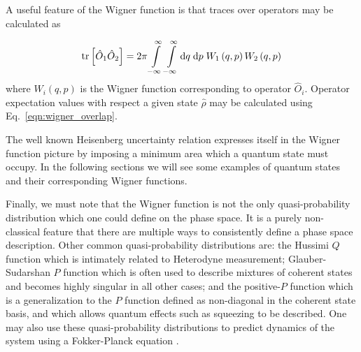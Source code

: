 
\noindent A useful feature of the Wigner function is that traces over operators may be calculated as

\begin{equation}\label{eqn:wigner_overlap}
\tr\left[\hat{O}_1 \hat{O}_2\right] = 2\pi \int\limits_{-\infty}^\infty \int\limits_{-\infty}^{\infty} \mathrm{d}q \; \mathrm{d}p \; W_1\left(q, p\right) W_2\left(q, p\right)
\end{equation}
where $W_i\left(q, p\right)$ is the Wigner function corresponding to operator $\hat{O}_i$. Operator expectation values with respect a given state $\hat{\rho}$ may be calculated using Eq.~\ref{eqn:wigner_overlap}. 

The well known Heisenberg uncertainty relation expresses itself in the Wigner function picture by imposing a minimum area which a quantum state must occupy. In the following sections we will see some examples of quantum states and their corresponding Wigner functions. 



Finally, we must note that the Wigner function is not the only quasi-probability distribution which one could define on the phase space. It is a purely non-classical feature that there are multiple ways to consistently define a phase space description. Other common quasi-probability distributions are: the Hussimi $Q$ function  which is intimately related to Heterodyne measurement; Glauber-Sudarshan  $P$ function which is often used to describe mixtures of coherent states and becomes highly singular in all other cases; and the positive-$P$ function which is a generalization to the $P$ function defined as non-diagonal in the coherent state basis, and which allows quantum effects such as squeezing to be described. One may also use these quasi-probability distributions to predict dynamics of the system using a Fokker-Planck equation .


\FloatBarrier
